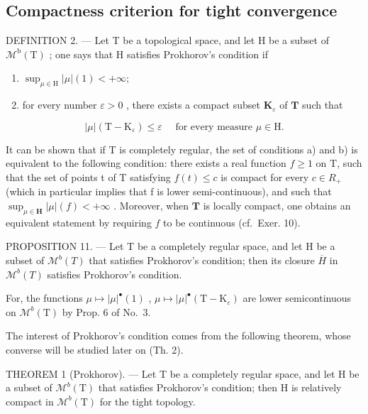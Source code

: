 \subsection{Compactness criterion for tight convergence}

DEFINITION 2. --- Let T be a topological space, and let H be a subset of \(\mathcal{M}^{\mathrm{b}}(\mathrm{T})\) ; one says that H satisfies Prokhorov's condition if

\begin{enumerate}
\def\labelenumi{\alph{enumi})}
\item
  \(\sup_{\mu \in \mathrm{H}}|\mu |(1) < +\infty ;\)
\item
  for every number \(\varepsilon > 0\) , there exists a compact subset \(\mathbf{K}_{\varepsilon}\) of \(\mathbf{T}\) such that
\end{enumerate}

\[
| \mu | (\mathrm{T} - \mathrm{K} _ {\varepsilon}) \leqslant \varepsilon \quad \text { for every measure } \mu \in \mathrm{H}.\tag{6}
\]

It can be shown that if T is completely regular, the set of conditions a) and b) is equivalent to the following condition: there exists a real function \(f \geqslant 1\) on T, such that the set of points t of T satisfying \(f(t) \leqslant c\) is compact for every \(c \in R_{+}\) (which in particular implies that f is lower semi-continuous), and such that \(\sup_{\mu \in \mathbf{H}} |\mu|(f) < +\infty\) . Moreover, when \(\mathbf{T}\) is locally compact, one obtains an equivalent statement by requiring \(f\) to be continuous (cf.~Exer. 10).

PROPOSITION 11. --- Let T be a completely regular space, and let H be a subset of \(\mathcal{M}^{b}(T)\) that satisfies Prokhorov's condition; then its closure \(\overline{H}\) in \(\mathcal{M}^{b}(T)\) satisfies Prokhorov's condition.

For, the functions \(\mu \mapsto |\mu|^{\bullet}(1)\) , \(\mu \mapsto |\mu|^{\bullet}(\mathrm{T} - \mathrm{K}_{\varepsilon})\) are lower semicontinuous on \(\mathcal{M}^b (\mathrm{T})\) by Prop. 6 of No.~3.

The interest of Prokhorov's condition comes from the following theorem, whose converse will be studied later on (Th. 2).

THEOREM 1 (Prokhorov). --- Let T be a completely regular space, and let H be a subset of \(\mathcal{M}^{b}(\mathrm{T})\) that satisfies Prokhorov's condition; then H is relatively compact in \(\mathcal{M}^{b}(\mathrm{T})\) for the tight topology.

